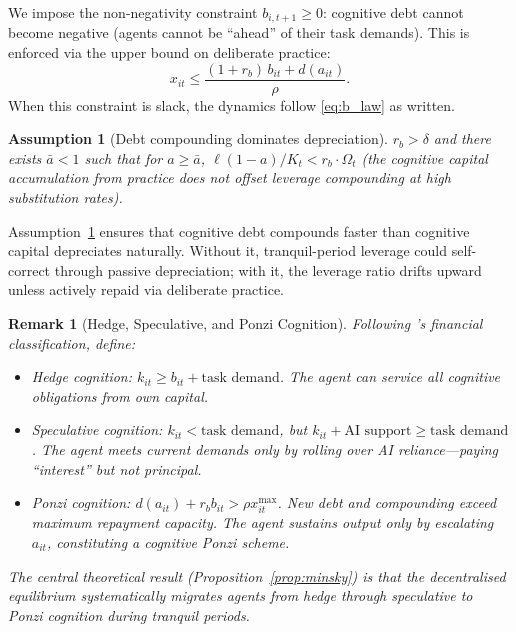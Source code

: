 \documentclass[12pt]{article}
\newtheorem{assumption}{Assumption}
\newtheorem{remark}{Remark}
\begin{document}
We impose the non-negativity constraint $b_{i,t+1} \geq 0$: cognitive debt cannot
become negative (agents cannot be ``ahead'' of their task demands). This is enforced
via the upper bound on deliberate practice:
\begin{equation}
x_{it} \leq \frac{(1+r_b)\,b_{it} + d(a_{it})}{\rho}.
\label{eq:b_nonneg}
\end{equation}
When this constraint is slack, the dynamics follow \eqref{eq:b_law} as written.

\begin{assumption}[Debt compounding dominates depreciation]
\label{ass:compounding}
$r_b > \delta$ and there exists $\bar{a} < 1$ such that for $a \geq \bar{a}$,
$\ell(1-a)/K_t < r_b \cdot \Omega_t$ (the cognitive capital accumulation from
practice does not offset leverage compounding at high substitution rates).
\end{assumption}

Assumption~\ref{ass:compounding} ensures that cognitive debt compounds faster than
cognitive capital depreciates naturally. Without it, tranquil-period leverage could
self-correct through passive depreciation; with it, the leverage ratio drifts upward
unless actively repaid via deliberate practice.

\begin{remark}[Hedge, Speculative, and Ponzi Cognition]
\label{rem:minsky-taxonomy}
Following \citet{Minsky1986}'s financial classification, define:
\begin{itemize}
\item \emph{Hedge cognition}: $k_{it} \geq b_{it} + \text{task demand}$.
The agent can service all cognitive obligations from own capital.
\item \emph{Speculative cognition}: $k_{it} < \text{task demand}$, but
$k_{it} + \text{AI support} \geq \text{task demand}$. The agent meets current
demands only by rolling over AI reliance---paying ``interest'' but not principal.
\item \emph{Ponzi cognition}: $d(a_{it}) + r_b b_{it} > \rho x_{it}^{\max}$.
New debt and compounding exceed maximum repayment capacity.
The agent sustains output only by escalating $a_{it}$, constituting a
cognitive Ponzi scheme.
\end{itemize}
The central theoretical result (Proposition~\ref{prop:minsky}) is that the
decentralised equilibrium systematically migrates agents from hedge through speculative
to Ponzi cognition during tranquil periods.
\end{remark}
\end{document}
